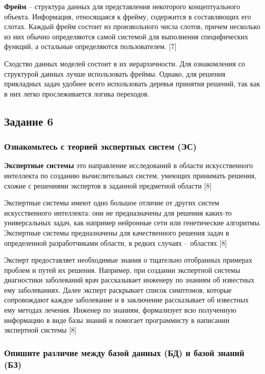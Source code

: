 \documentclass[14pt,a4paper,report]{report}
\begin{document}
\textbf{Фрейм} -- структура данных для представления некоторого концептуального объекта. Информация, относящаяся к фрейму, содержится в составляющих его слотах. Каждый фрейм состоит из произвольного числа слотов, причем несколько из них обычно определяются самой системой для выполнения специфических функций, а остальные определяются пользователем. [7]

Сходство данных моделей состоит в их иерархичности. Для ознакомления со структурой данных лучше использовать фреймы. Однако, для решения прикладных задач удобнее всего использовать деревья принятия решений, так как в них легко прослеживается логика переходов. 

\subsection{Задание 6}

\subsubsection{Ознакомьтесь с теорией экспертных систем (ЭС)}

\textbf{Экспертные системы} это направление исследований в области искусственного интеллекта по созданию вычислительных систем, умеющих принимать решения, схожие с решениями экспертов в заданной предметной области [8]

Экспертные системы имеют одно большое отличие от других систем искусственного интеллекта: они не предназначены для решения каких-то универсальных задач, как например нейронные сети или генетические алгоритмы. Экспертные системы предназначены для качественного решения задач в определенной разработчиками области, в редких случаях – областях [8]

Эксперт предоставляет необходимые знания о тщательно отобранных примерах проблем и путей их решения. Например, при создании экспертной системы диагностики заболеваний врач рассказывает инженеру по знаниям об известных ему заболеваниях. Далее эксперт раскрывает список симптомов, которые сопровождают каждое заболевание и в заключение рассказывает об известных ему методах лечения. Инженер по знаниям, формализует всю полученную информацию в виде базы знаний и помогает программисту в написании экспертной системы [8]

\subsubsection{Опишите различие между базой данных (БД) и базой знаний (БЗ)}
\end{document}
